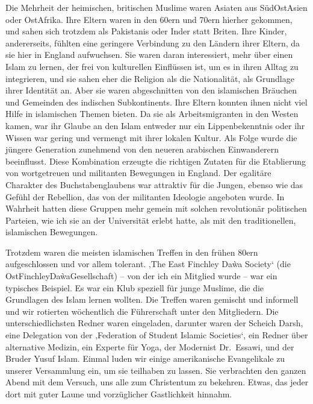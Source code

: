 \documentclass[12pt]{memoir}
\begin{document}
Die Mehrheit der heimischen, britischen Muslime
waren Asiaten aus Süd\–Ost\–Asien oder Ost\–Afrika.
Ihre Eltern waren in den 60ern und 70ern hierher gekommen,
und sahen sich trotzdem als Pakistanis oder Inder statt Briten.
Ihre Kinder, andererseits,
fühlten eine geringere Verbindung zu den Ländern ihrer Eltern,
da sie hier in England aufwuchsen.
Sie waren daran interessiert, mehr über einen Islam zu lernen,
der frei von kulturellen Einflüssen ist,
um es in ihren Alltag zu integrieren,
und sie sahen eher die Religion als die Nationalität,
als Grundlage ihrer Identität an.
Aber sie waren abgeschnitten von den islamischen Bräuchen
und Gemeinden des indischen Subkontinents.
Ihre Eltern konnten ihnen nicht viel Hilfe in islamischen Themen bieten.
Da sie als Arbeitsmigranten in den Westen kamen,
war ihr Glaube an den Islam entweder nur ein Lippenbekenntnis
oder ihr Wissen war gering und vermengt mit ihrer lokalen Kultur.
Als Folge wurde die jüngere Generation zunehmend
von den neueren arabischen Einwanderern beeinflusst.
Diese Kombination erzeugte die richtigen Zutaten für
die Etablierung von wortgetreuen und militanten Bewegungen in England.
Der egalitäre Charakter des Buchstabenglaubens war attraktiv für die Jungen,
ebenso wie das Gefühl der Rebellion,
das von der militanten Ideologie angeboten wurde.
In Wahrheit hatten diese Gruppen mehr gemein
mit solchen revolutionär politischen Parteien,
wie ich sie an der Universität erlebt hatte,
als mit den traditionellen, islamischen Bewegungen.

Trotzdem waren die meisten islamischen Treffen in den frühen 80ern
aufgeschlossen und vor allem tolerant.
‚The East Finchley Da\`wa Society‘ (die Ost\–Finchley\–Da\`wa\–Gesellschaft)
– von der ich ein Mitglied wurde – war ein typisches Beispiel.
Es war ein Klub speziell für junge Muslime,
die die Grundlagen des Islam lernen wollten.
Die Treffen waren gemischt und informell
und wir rotierten wöchentlich die Führerschaft unter den Mitgliedern.
Die unterschiedlichsten Redner waren eingeladen,
darunter waren der Scheich Darsh,
eine Delegation von der ‚Federation of Student Islamic Societies‘,
ein Redner über alternative Medizin, ein Experte für Yoga,
der Modernist Dr.\ Essawi, und der Bruder Yusuf Islam.
Einmal luden wir einige amerikanische Evangelikale
zu unserer Versammlung ein, um sie teilhaben zu lassen.
Sie verbrachten den ganzen Abend mit dem Versuch,
uns alle zum Christentum zu bekehren.
Etwas, das jeder dort mit guter Laune und vorzüglicher Gastlichkeit hinnahm.
\end{document}
